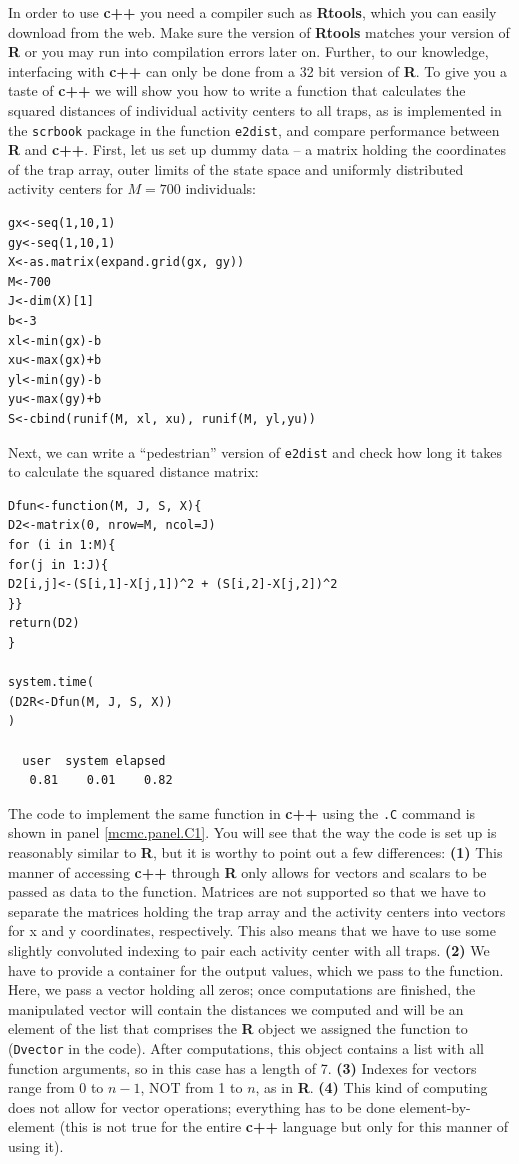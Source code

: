 In order to use {\bf c++} you need a compiler such as {\bf Rtools}, which you can easily download from the web. Make sure the version of {\bf Rtools} matches your version of {\bf R} or you may run into compilation errors later on. Further, to our knowledge, interfacing with {\bf c++} can only be done from a 32 bit version of {\bf R}. To give you a taste of {\bf c++} we will show you how to write a function that calculates the squared distances of individual activity centers to all traps, as is implemented in the {\tt scrbook} package in the function {\tt e2dist}, and compare performance between {\bf R} and {\bf c++}. First, let us set up dummy data --  a matrix holding the coordinates of the trap array, outer limits of the state space and uniformly distributed activity centers for $M=700$ individuals:
{\small
\begin{verbatim} 
gx<-seq(1,10,1)
gy<-seq(1,10,1)
X<-as.matrix(expand.grid(gx, gy))
M<-700
J<-dim(X)[1]
b<-3
xl<-min(gx)-b
xu<-max(gx)+b
yl<-min(gy)-b
yu<-max(gy)+b
S<-cbind(runif(M, xl, xu), runif(M, yl,yu))
\end{verbatim}
}
Next, we can write a ``pedestrian'' version of {\tt e2dist} and check how long it takes to calculate the squared distance matrix:
{\small
\begin{verbatim} 
Dfun<-function(M, J, S, X){
D2<-matrix(0, nrow=M, ncol=J)
for (i in 1:M){
for(j in 1:J){
D2[i,j]<-(S[i,1]-X[j,1])^2 + (S[i,2]-X[j,2])^2
}}
return(D2)
}

system.time(
(D2R<-Dfun(M, J, S, X))
)

  user  system elapsed 
   0.81    0.01    0.82 
\end{verbatim}
}
The code to implement the same function in {\bf c++} using the {\tt .C} command is shown in panel \ref{mcmc.panel.C1}. You will see that the way the code is set up is reasonably similar to {\bf R}, but it is worthy to point out a few differences: {\bf (1)} This manner of accessing {\bf c++} through {\bf R} only allows for vectors and scalars to be passed as data to the function. Matrices are not supported so that we have to separate the matrices holding the trap array and the activity centers into vectors for x and y coordinates, respectively. This also means that we have to use some slightly convoluted indexing to pair each activity center with all traps. {\bf (2)} We have to provide a container for the output values, which we pass to the function. Here, we pass a vector holding all zeros; once computations are finished, the manipulated vector will contain the distances we computed and will be an element of the list that comprises the {\bf R} object we assigned the function to ({\tt Dvector} in the code). After computations, this object contains a list with all function arguments, so in this case has a length of 7. {\bf (3)} Indexes for vectors range from 0 to $n-1$, NOT from 1 to $n$, as in {\bf R}. {\bf (4)} This kind of computing does not allow for vector operations; everything has to be done element-by-element (this is not true for the entire {\bf c++} language but only for this manner of using it). 

